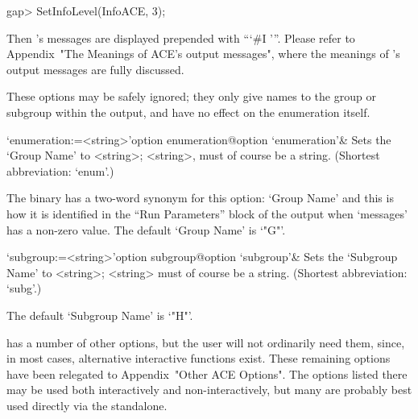 \beginexample
gap> SetInfoLevel(InfoACE, 3);

\endexample

Then {\ACE}'s messages are  displayed  prepended  with  ```\#I  '''.
Please refer to Appendix~"The  Meanings  of  ACE's  output  messages",
where the meanings of {\ACE}'s output messages are fully discussed.

\enditems


These options may be safely ignored; they only give names to the group
or subgroup within the {\ACE}  output,  and  have  no  effect  on  the
enumeration itself.

\beginitems

\>`enumeration:=<string>'{option enumeration}@{option `enumeration'}&
Sets the `Group Name' to <string>;  <string>,  must  of  course  be  a
string. (Shortest abbreviation: `enum'.)

The {\ACE} binary has a two-word synonym for this option: `Group Name'
and this is how it is identified in the ``Run  Parameters''  block  of
the {\ACE} output when `messages' has a non-zero  value.  The  default
`Group Name' is `"G"'.

\>`subgroup:=<string>'{option subgroup}@{option `subgroup'}& 
Sets the `Subgroup Name' to <string>; <string> must  of  course  be  a
string. (Shortest abbreviation: `subg'.)

The default `Subgroup Name' is `"H"'.

\enditems


{\ACE} has a number of other options, but the  {\GAP}  user  will  not
ordinarily need them, since, in most  cases,  alternative  interactive
functions exist.  These  remaining  options  have  been  relegated  to
Appendix~"Other ACE Options". The options listed  there  may  be  used
both interactively and non-interactively, but many are  probably  best
used directly via the {\ACE} standalone.


